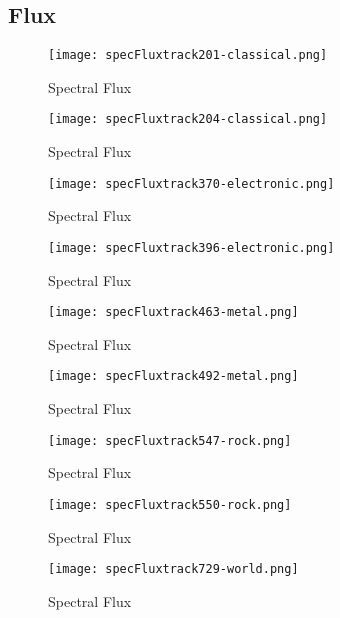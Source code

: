 \documentclass{article} %
\begin{document}
\subsection{Flux}

\begin{figure}[H]
\centering
\texttt{[image: specFluxtrack201-classical.png]}
\caption{Spectral Flux}
\label{fig:flux201}
\end{figure}

\begin{figure}[H]
\centering
\texttt{[image: specFluxtrack204-classical.png]}
\caption{Spectral Flux}
\label{fig:flux204}
\end{figure}

\begin{figure}[H]
\centering
\texttt{[image: specFluxtrack370-electronic.png]}
\caption{Spectral Flux}
\label{fig:flux370}
\end{figure}


\begin{figure}[H]
\centering
\texttt{[image: specFluxtrack396-electronic.png]}
\caption{Spectral Flux}
\label{fig:flux396}
\end{figure}


\begin{figure}[H]
\centering
\texttt{[image: specFluxtrack463-metal.png]}
\caption{Spectral Flux}
\label{fig:flux463}
\end{figure}


\begin{figure}[H]
\centering
\texttt{[image: specFluxtrack492-metal.png]}
\caption{Spectral Flux}
\label{fig:flux492}
\end{figure}


\begin{figure}[H]
\centering
\texttt{[image: specFluxtrack547-rock.png]}
\caption{Spectral Flux}
\label{fig:flux547}
\end{figure}


\begin{figure}[H]
\centering
\texttt{[image: specFluxtrack550-rock.png]}
\caption{Spectral Flux}
\label{fig:flux550}
\end{figure}


\begin{figure}[H]
\centering
\texttt{[image: specFluxtrack729-world.png]}
\caption{Spectral Flux}
\label{fig:flux729}
\end{figure}
\end{document}
